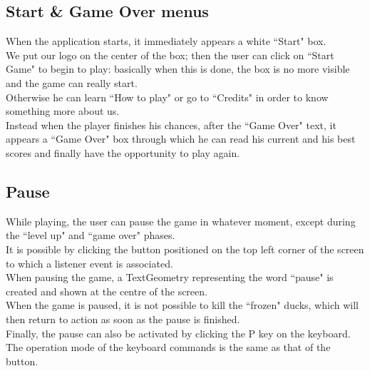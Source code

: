 \documentclass[12pt,a4paper]{article}
\begin{document}
	\subsection{Start \& Game Over menus}
	When the application starts, it immediately appears a white ``Start" box.\\
	We put our logo on the center of the box; then the user can click on ``Start Game" to begin to play: basically when this is done, the box is no more visible and the game can really start. \\
	Otherwise he can learn ``How to play" or go to ``Credits" in order to know something more about us.\\
	Instead when the player finishes his chances, after the ``Game Over" text, it appears a ``Game Over" box through which he can read his current and his best scores and finally have the opportunity to play again.
	
	\subsection{Pause}
	While playing, the user can pause the game in whatever moment, except during the ``level up" and ``game over" phases.\\
	It is possible by clicking the button positioned on the top left corner of the screen to which a listener event is associated.\\
	When pausing the game, a TextGeometry representing the word ``pause" is created and shown at the centre of the screen.\\
	When the game is paused, it is not possible to kill the ``frozen" ducks, which will then return to action as soon as the pause is finished.\\
	Finally, the pause can also be activated by clicking the P key on the keyboard. The operation mode of the keyboard commands is the same as that of the button.
\end{document}
